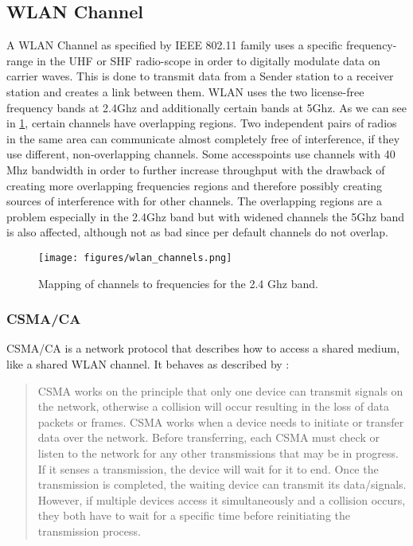   \subsection{\ac{WLAN} Channel}
    A \ac{WLAN} Channel as specified by IEEE 802.11 family uses a specific frequency-range in the \ac{UHF} or \ac{SHF} radio-scope in order 
    to digitally modulate data on carrier waves.
    This is done to transmit data from a Sender station to a receiver station and creates a link between them.
    \ac{WLAN} uses the two license-free frequency bands at 2.4Ghz and additionally certain bands at 5Ghz.
    As we can see in \ref{fig:wlan_channels}, certain channels have overlapping regions. 
    Two independent pairs of radios in the same area can communicate almost completely free of interference, if they use different, non-overlapping channels.
    Some accesspoints use channels with 40 Mhz bandwidth in order to further increase throughput with the drawback of creating more overlapping frequencies regions
    and therefore possibly creating sources of interference with for other channels.
    The overlapping regions are a problem especially in the 2.4Ghz band but with widened channels the 5Ghz band is also affected, although not as bad since per default
    channels do not overlap.
    
    \begin{figure}[h!]
      \centering
      \texttt{[image: figures/wlan\_channels.png]}
      \caption{Mapping of channels to frequencies for the 2.4 Ghz band. \cite{wlan_channels}}
      \label{fig:wlan_channels}
    \end{figure}
    
      \subsubsection{\ac{CSMA/CA}}
	\ac{CSMA/CA} is a network protocol that describes how to access a shared medium, like a shared WLAN channel.
	It behaves as described by \cite{csma_techo}:
	\begin{quotation}
	  CSMA works on the principle that only one device can transmit signals on the network, 
	  otherwise a collision will occur resulting in the loss of data packets or frames. 
	  CSMA works when a device needs to initiate or transfer data over the network. 
	  Before transferring, each CSMA must check or listen to the network for any other transmissions that may be in progress. 
	  If it senses a transmission, the device will wait for it to end. Once the transmission is completed, 
	  the waiting device can transmit its data/signals. However, if multiple devices access it simultaneously and a collision occurs, 
	  they both have to wait for a specific time before reinitiating the transmission process. 
	\end{quotation}
	
